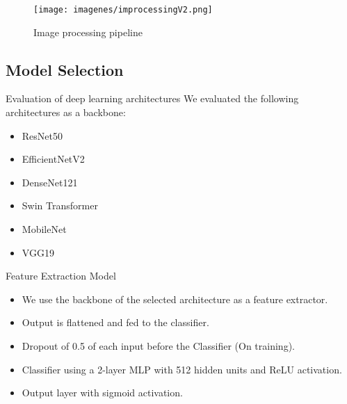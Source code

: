 \begin{frame}[plain]
    \begin{figure}
        \centering
        \texttt{[image: imagenes/improcessingV2.png]}
        \caption{Image processing pipeline}
    \end{figure}
\end{frame}
\subsection{Model Selection}
\begin{frame}{Evaluation of deep learning architectures}
    We evaluated the following architectures as a backbone:
    \begin{itemize}
        \item ResNet50 \cite{heDeepResidualLearning2015}
        \item EfficientNetV2 \cite{tanEfficientNetV2SmallerModels2021}
        \item DenseNet121 \cite{huangDenselyConnectedConvolutional2018}
        \item Swin Transformer \cite{liuSwinTransformerHierarchical2021}
        \item MobileNet \cite{howardMobileNetsEfficientConvolutional2017}
        \item VGG19 \cite{simonyanVeryDeepConvolutional2015}
    \end{itemize}
    
\end{frame}

\begin{frame}{Feature Extraction Model}
    \begin{itemize}
        \item We use the backbone of the selected architecture as a feature extractor.
        \item Output is flattened and fed to the classifier.
        \item Dropout of \num{0.5} of each input before the Classifier (On training).
        \item Classifier using a 2-layer MLP with \num{512} hidden units and ReLU activation.
        \item Output layer with sigmoid activation.
    \end{itemize}
\end{frame}


